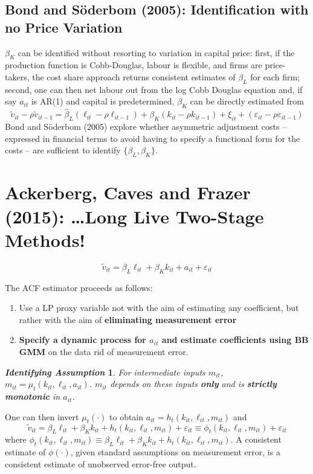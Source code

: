\documentclass[11pt]{article}
\newtheorem*{idass}{\textit{Identifying Assumption}}
\begin{document}
\subsection*{Bond and S\"{o}derbom (2005): Identification with no Price Variation}

$\beta_K$ can be identified without resorting to variation in capital price: first, if the production function is Cobb-Douglas, labour is flexible, and firms are price-takers, the cost share approach returns consistent estimates of $\beta_L$ for each firm; second, one can then net labour out from the log Cobb Douglas equation and, if say $a_{it}$ is AR(1) and capital is predetermined, $\beta_K$ can be directly estimated from
\begin{equation*}
	\tilde{v}_{it} - 	\rho \tilde{v}_{it-1} = \hat{\beta}_L (\ell_{it} - \rho \ell_{it-1}) + \beta_K (k_{it} - \rho k_{it-1}) + \xi_{it} + (\varepsilon_{it} - \rho \varepsilon_{it-1})
\end{equation*}
Bond and S\"{o}derbom (2005) explore whether asymmetric adjustment costs -- expressed in financial terms to avoid having to specify a functional form for the costs -- are sufficient to identify $\{\beta_L, \beta_K\}$.

\section{Ackerberg, Caves and Frazer (2015): \dots Long Live Two-Stage Methods!}

\begin{equation}
	\tilde{v}_{it} = \beta_L \ell_{it} + \beta_K k_{it} + a_{it} + \varepsilon_{it}
\end{equation}

The ACF estimator proceeds as follows:
\begin{enumerate}
	\item Use a LP proxy variable not with the aim of estimating any coefficient, but rather with the aim of \textbf{eliminating measurement error}
	\item \textbf{Specify a dynamic process for $a_{it}$ and estimate coefficients using BB GMM} on the data rid of measurement error.
\end{enumerate}

\begin{idass}
	For intermediate inputs $m_{it}$, $m_{it} = \mu_t(k_{it}, \ell_{it}, a_{it})$. $m_{it}$ depends on these inputs \textbf{only} and is \textbf{strictly monotonic} in $a_{it}$.
\end{idass}
One can then invert $\mu_t(\cdot)$ to obtain $a_{it} = h_t (k_{it}, \ell_{it}, m_{it})$ and
\begin{equation*}
		\tilde{v}_{it} = \beta_L \ell_{it} + \beta_K k_{it} + h_t (k_{it}, \ell_{it}, m_{it}) + \varepsilon_{it} \equiv \phi_t (k_{it}, \ell_{it}, m_{it}) + \varepsilon_{it}
\end{equation*}
where $\phi_t (k_{it}, \ell_{it}, m_{it}) \equiv \beta_L \ell_{it} + \beta_K k_{it} + h_t (k_{it}, \ell_{it}, m_{it})$.
A consistent estimate of $\phi(\cdot)$, given standard assumptions on measurement error, is a consistent estimate of unobserved error-free output.
\end{document}
